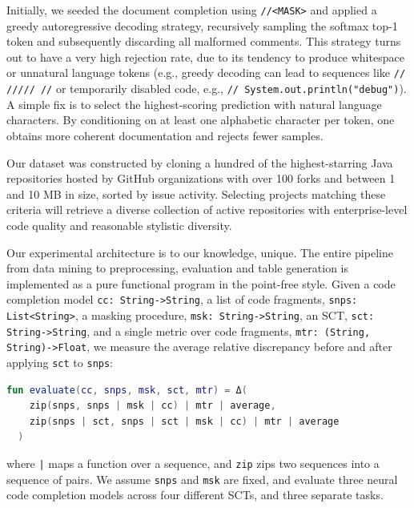 \documentclass[usenames,dvipsnames]{article} %
\begin{document}
  Initially, we seeded the document completion using \lstinline|//<MASK>| and applied a greedy autoregressive decoding strategy, recursively sampling the softmax top-1 token and subsequently discarding all malformed comments. This strategy turns out to have a very high rejection rate, due to its tendency to produce whitespace or unnatural language tokens (e.g., greedy decoding can lead to sequences like \lstinline|// ///// //| or temporarily disabled code, e.g., \lstinline|// System.out.println("debug")|). A simple fix is to select the highest-scoring prediction with natural language characters. By conditioning on at least one alphabetic character per token, one obtains more coherent documentation and rejects fewer samples. %

  Our dataset was constructed by cloning a hundred of the highest-starring Java repositories hosted by GitHub organizations with over 100 forks and between 1 and 10 MB in size, sorted by issue activity. Selecting projects matching these criteria will retrieve a diverse collection of active repositories with enterprise-level code quality and reasonable stylistic diversity.

  Our experimental architecture is to our knowledge, unique. The entire pipeline from data mining to preprocessing, evaluation and table generation is implemented as a pure functional program in the point-free style. Given a code completion model \lstinline|cc: String->String|, a list of code fragments, \lstinline|snps: List<String>|, a masking procedure, \lstinline|msk: String->String|, an SCT, \lstinline|sct: String->String|, and a single metric over code fragments, \lstinline|mtr: (String, String)->Float|, we measure the average relative discrepancy before and after applying \lstinline|sct| to \lstinline|snps|:

  \noindent\begin{lstlisting}[basicstyle=\footnotesize\ttfamily, language=kotlin,label={lst:lstlisting}]
  fun evaluate(cc, snps, msk, sct, mtr) = Δ(
    zip(snps, snps | msk | cc) | mtr | average,
    zip(snps | sct, snps | sct | msk | cc) | mtr | average
  )
  \end{lstlisting}

  \noindent where \texttt{|} maps a function over a sequence, and \lstinline|zip| zips two sequences into a sequence of pairs. We assume \lstinline|snps| and \lstinline|msk| are fixed, and evaluate three neural code completion models across four different SCTs, and three separate tasks.
\end{document}
